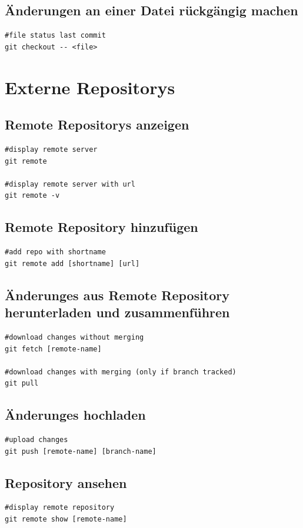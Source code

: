 \subsection{Änderungen an einer Datei rückgängig machen}
\begin{lstlisting}[caption={Änderungen an Datei rückgängig machen},captionpos=b]
#file status last commit
git checkout -- <file>
\end{lstlisting}
\section{Externe Repositorys}
\subsection{Remote Repositorys anzeigen}
\begin{lstlisting}[caption={Repo anzeigen},captionpos=b]
#display remote server
git remote

#display remote server with url
git remote -v
\end{lstlisting}
\subsection{Remote Repository hinzufügen}
\begin{lstlisting}[caption={Repo hinzufügen},captionpos=b]
#add repo with shortname
git remote add [shortname] [url]
\end{lstlisting}
\subsection{Änderunges aus Remote Repository herunterladen und zusammenführen}
\begin{lstlisting}[caption={Repo zusammenführen},captionpos=b]
#download changes without merging
git fetch [remote-name]

#download changes with merging (only if branch tracked)
git pull
\end{lstlisting}
\subsection{Änderunges hochladen}
\begin{lstlisting}[caption={Änderungen hochladen},captionpos=b]
#upload changes
git push [remote-name] [branch-name]
\end{lstlisting}
\subsection{Repository ansehen}
\begin{lstlisting}[caption={Repository ansehen},captionpos=b]
#display remote repository
git remote show [remote-name]
\end{lstlisting}
